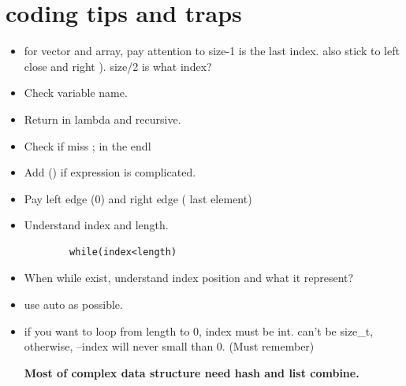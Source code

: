\documentclass[a4paper,11pt,twoside]{book}
\begin{document}
\section{coding tips and traps}
\begin{itemize}
	\item for vector and array, pay attention to size-1 is the last index. also stick to left close and right ).  size/2 is what index?  
	\item Check variable name. 
	\item Return in lambda and recursive. 
	\item Check if miss ; in the endl
	\item Add () if expression is complicated. 
	\item Pay left edge (0) and right edge ( last element)
	\item Understand index and length. 
	\begin{lstlisting}
		while(index<length)
	\end{lstlisting}
	\item When while exist, understand index position and what it represent?
	\item use auto as possible.
	
	\item if you want to loop from length to 0, index must be int. can't be size\_t, otherwise, --index will never small than 0. (Must remember)
	
	\textbf{Most of complex data structure need hash and list combine.}
\end{itemize}

\end{document}
